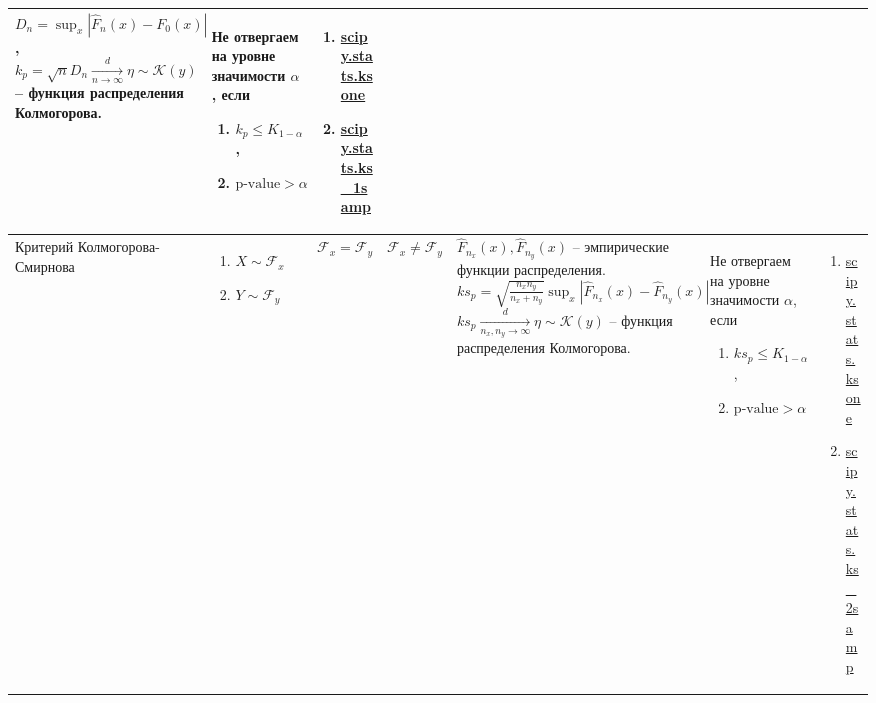\documentclass[14pt, a1paper, fleqn]{extarticle}
\begin{document}
\begin{center}
\begin{tabular}{|p{6cm}|p{8cm}|p{3cm}|p{3cm}|p{9cm}|p{10cm}|p{14cm}|}
            \( D_n = \sup_x \left| \widehat{F}_n (x) - F_0 (x) \right| \),
            \newline
            \( k_p = \sqrt{n} D_n \xrightarrow[n \to \infty]{d} \eta \sim \mathcal{K}(y) \) -- функция распределения Колмогорова.
            & Не отвергаем на уровне значимости \( \alpha \), если 
            \begin{enumerate}
                \item \( k_p \leq K_{1-\alpha} \),
                \item \( \text{p-value} > \alpha \)
            \end{enumerate} 
            & \begin{enumerate}
                \item \href{https://docs.scipy.org/doc/scipy/reference/generated/scipy.stats.ksone.html}{scipy.stats.ksone}
                \item \href{https://docs.scipy.org/doc/scipy/reference/generated/scipy.stats.ks_1samp.html}{scipy.stats.ks\_1samp}
            \end{enumerate} \\
            \hline
            Критерий Колмогорова-Смирнова
            & \begin{enumerate}
             \item \( X \sim \mathcal{F}_x \)
             \item \( Y \sim \mathcal{F}_y \)
            \end{enumerate} 
            & \( \mathcal{F}_x = \mathcal{F}_y \) 
            & \( \mathcal{F}_x \neq \mathcal{F}_y \) 
            & \( \widehat{F}_{n_x} (x), \widehat{F}_{n_y} (x) \) -- эмпирические функции распределения.
            \newline
            \( ks_p = \sqrt{\frac{n_x n_y}{n_x + n_y}} \sup_x \left| \widehat{F}_{n_x} (x) - \widehat{F}_{n_y} (x) \right|\) 
            \( ks_p \xrightarrow[n_x, n_y \to \infty]{d} \eta \sim \mathcal{K}(y) \) -- функция распределения Колмогорова.
            & Не отвергаем на уровне значимости \( \alpha \), если 
            \begin{enumerate}
                \item \( ks_p \leq K_{1-\alpha} \),
                \item \( \text{p-value} > \alpha \)
            \end{enumerate} 
            & \begin{enumerate}
                \item \href{https://docs.scipy.org/doc/scipy/reference/generated/scipy.stats.ksone.html}{scipy.stats.ksone}
                \item \href{https://docs.scipy.org/doc/scipy/reference/generated/scipy.stats.ks_2samp.html}{scipy.stats.ks\_2samp}
            \end{enumerate} \\
            \hline
        \end{tabular}
    \end{center}
\end{document}
